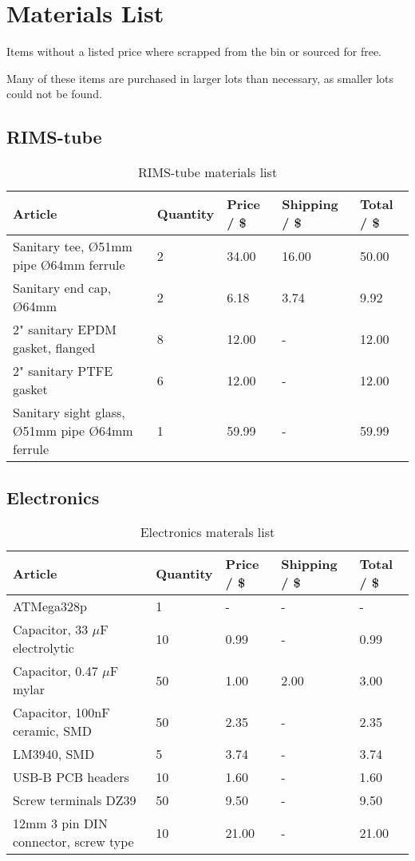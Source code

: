\documentclass[11pt,fleqn,openany]{book} %
\begin{document}


\chapter{Materials List}

Items without a listed price where scrapped from the bin or sourced for free.

Many of these items are purchased in larger lots than necessary, as smaller lots could not be found.

\section{RIMS-tube}

\begin{table}[h]
\centering
\begin{tabular}{l l l l l}
\toprule
Article & Quantity & Price / \$ & Shipping / \$ & Total / \$\\
\midrule
Sanitary tee, Ø51mm pipe Ø64mm ferrule & 2 & 34.00 & 16.00 & 50.00 \\
Sanitary end cap, Ø64mm & 2 & 6.18 & 3.74 & 9.92 \\
2" sanitary EPDM gasket, flanged & 8 & 12.00 & - & 12.00 \\
2" sanitary PTFE gasket & 6 & 12.00 & - & 12.00 \\
Sanitary sight glass, Ø51mm pipe Ø64mm ferrule & 1 & 59.99 & - & 59.99\\
\bottomrule
\end{tabular}
\caption{RIMS-tube materials list}
\end{table}

\section{Electronics}

\begin{table}[h]
\centering
\begin{tabular}{l l l l l}
\toprule
Article & Quantity & Price / \$ & Shipping / \$ & Total / \$\\
\midrule
ATMega328p & 1 & - & - & - \\
Capacitor, 33 $\mu$F electrolytic & 10 & 0.99 & - & 0.99 \\
Capacitor, 0.47 $\mu$F mylar & 50 & 1.00 & 2.00 & 3.00 \\
Capacitor, 100nF ceramic, SMD & 50 & 2.35 & - & 2.35 \\
LM3940, SMD & 5 & 3.74 & - & 3.74 \\
USB-B PCB headers & 10 & 1.60 & - & 1.60 \\
Screw terminals DZ39 & 50 & 9.50 & - & 9.50 \\
12mm 3 pin DIN connector, screw type & 10 & 21.00 & - & 21.00 \\
\bottomrule
\end{tabular}
\caption{Electronics materals list}
\end{table}
\end{document}
